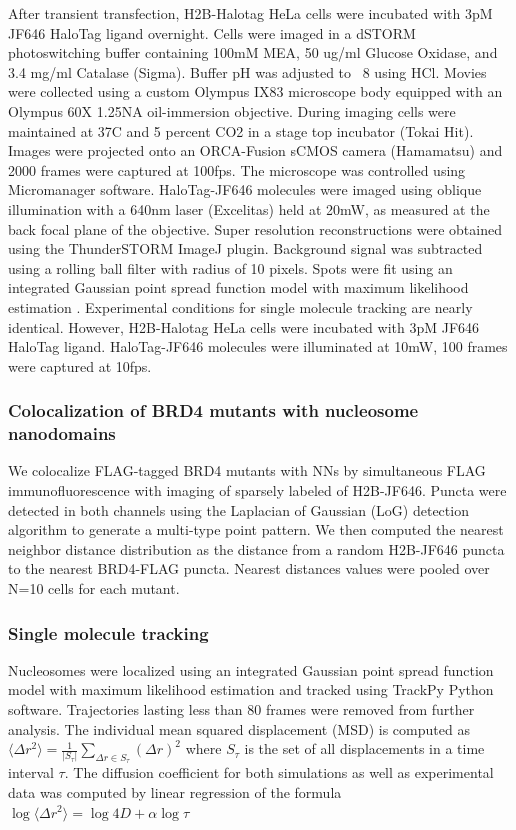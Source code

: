 After transient transfection, H2B-Halotag HeLa cells were incubated with 3pM JF646 HaloTag ligand overnight. Cells were imaged in a dSTORM photoswitching buffer containing 100mM MEA, 50 ug/ml Glucose Oxidase, and 3.4 mg/ml Catalase (Sigma). Buffer pH was adjusted to ~8 using HCl. Movies were collected using a custom Olympus IX83 microscope body equipped with an Olympus 60X 1.25NA oil-immersion objective. During imaging cells were maintained at 37C and 5 percent CO2 in a stage top incubator (Tokai Hit). Images were projected onto an ORCA-Fusion sCMOS camera (Hamamatsu) and 2000 frames were captured at 100fps. The microscope was controlled using Micromanager software. HaloTag-JF646 molecules were imaged using oblique illumination with a 640nm laser (Excelitas) held at 20mW, as measured at the back focal plane of the objective. Super resolution reconstructions were obtained using the ThunderSTORM ImageJ plugin. Background signal was subtracted using a rolling ball filter with radius of 10 pixels. Spots were fit using an integrated Gaussian point spread function model with maximum likelihood estimation \parencite{Smith2010,Huang2013}. Experimental conditions for single molecule tracking are nearly identical. However, H2B-Halotag HeLa cells were incubated with 3pM JF646 HaloTag ligand. HaloTag-JF646 molecules were illuminated at 10mW, 100 frames were captured at 10fps. 


\subsubsection{Colocalization of BRD4 mutants with nucleosome nanodomains}

We colocalize FLAG-tagged BRD4 mutants with NNs by simultaneous FLAG immunofluorescence with imaging of sparsely labeled of H2B-JF646. Puncta were detected in both channels using the Laplacian of Gaussian (LoG) detection algorithm to generate a multi-type point pattern. We then computed the nearest neighbor distance distribution as the distance from a random H2B-JF646 puncta to the nearest BRD4-FLAG puncta. Nearest distances values were pooled over N=10 cells for each mutant. 

\subsubsection{Single molecule tracking}

Nucleosomes were localized using an integrated Gaussian point spread function model with maximum likelihood estimation \parencite{Smith2010,Huang2013} and tracked using TrackPy Python software.  Trajectories lasting less than 80 frames were removed from further analysis. The individual mean squared displacement (MSD) is computed as $\langle \Delta r^{2}\rangle = \frac{1}{\lvert S_{\tau}\lvert}\sum_{\Delta r \in S_{\tau}}(\Delta r)^{2}$
where $S_\tau$ is the set of all displacements in a time interval $\tau$. The diffusion coefficient for both simulations as well as experimental data was computed by linear regression of the formula $\log\langle \Delta r^{2}\rangle  = \log 4D + \alpha \log \tau$

